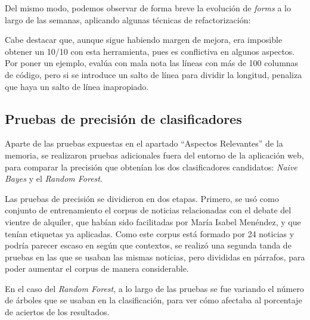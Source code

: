 



Del mismo modo, podemos observar de forma breve la evolución de \emph{forms} a lo largo de las semanas, aplicando algunas técnicas de refactorización:





Cabe destacar que, aunque sigue habiendo margen de mejora, era imposible obtener un 10/10 con esta herramienta, pues es conflictiva en algunos aspectos. Por poner un ejemplo, evalúa con mala nota las líneas con más de 100 columnas de código, pero si se introduce un salto de línea para dividir la longitud, penaliza que haya un salto de línea inapropiado.

\subsection{Pruebas de precisión de clasificadores}

Aparte de las pruebas expuestas en el apartado ``Aspectos Relevantes'' de la memoria, se realizaron pruebas adicionales fuera del entorno de la aplicación web, para comparar la precisión que obtenían los dos clasificadores candidatos: \emph{Naive Bayes} y el \emph{Random Forest}. 

Las pruebas de precisión se dividieron en dos etapas. Primero, se usó como conjunto de entrenamiento el corpus de noticias relacionadas con el debate del vientre de alquiler, que habían sido facilitadas por María Isabel Menéndez, y que tenían etiquetas ya aplicadas. Como este corpus está formado por 24 noticias y podría parecer escaso en según que contextos, se realizó una segunda tanda de pruebas en las que se usaban las mismas noticias, pero divididas en párrafos, para poder aumentar el corpus de manera considerable.

En el caso del \emph{Random Forest}, a lo largo de las pruebas se fue variando el número de árboles que se usaban en la clasificación, para ver cómo afectaba al porcentaje de aciertos de los resultados. 

